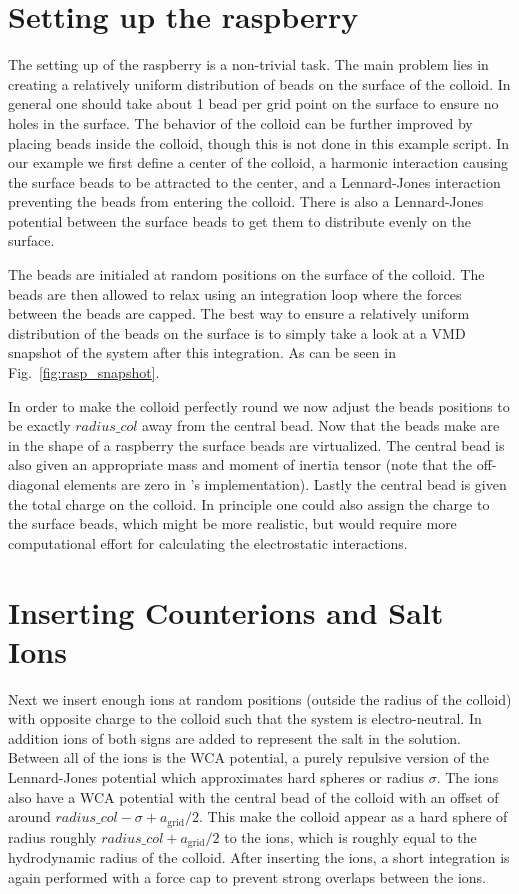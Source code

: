 \documentclass[
paper=a4,                       %
fontsize=11pt,                  %
twoside,                        %
footsepline,                    %
headsepline,                    %
headinclude=false,              %
footinclude=false,              %
pagesize,                       %
]{scrartcl}
\begin{document}
\section{Setting up the raspberry}

The setting up of the raspberry is a non-trivial task. The main problem lies in creating a relatively
uniform distribution of beads on the surface of the colloid. In general one should take about 1 bead per grid
point on the surface to ensure no holes in the surface. The behavior of the colloid can be further improved by placing
beads inside the colloid, though this is not done in this example script. In our example
we first define a center of the colloid, a harmonic interaction causing the surface beads to be attracted
to the center, and a Lennard-Jones interaction preventing the beads from entering the colloid. There is also a Lennard-Jones
potential between the surface beads to get them to distribute evenly on the surface. 

The beads are initialed at random positions on the surface of the colloid. The beads are then allowed to relax using
an integration loop where the forces between the beads are capped. The best way to ensure a relatively uniform distribution
of the beads on the surface is to simply take a look at a VMD snapshot of the system after this integration. As can
be seen in Fig.~\ref{fig:rasp_snapshot}.

In order to make the colloid perfectly round we now adjust the beads positions to be exactly $radius\_col$ away
from the central bead.
Now that the beads make are in the shape of a raspberry the surface beads are virtualized. The central
bead is also given an appropriate mass and moment of inertia tensor (note that the off-diagonal elements
are zero in \es{}'s implementation). Lastly the central bead is given the total charge on the colloid. In principle
one could also assign the charge to the surface beads, which might be more realistic, but would require more computational
effort for calculating the electrostatic interactions.

\section{Inserting Counterions and Salt Ions}

Next we insert enough ions at random positions (outside the radius of the colloid) with opposite charge to the colloid such that the system is electro-neutral. In addition ions
of both signs are added to represent the salt in the solution. Between all of the ions is the WCA potential, a purely repulsive
version of the Lennard-Jones potential which approximates hard spheres or radius $\sigma$. The ions also have a WCA potential
with the central bead of the colloid with an offset of around $radius\_col-\sigma +a_\mathrm{grid}/2$. This make
the colloid appear as a hard sphere of radius roughly $radius\_col+a_\mathrm{grid}/2$ to the ions, which is roughly equal to the
hydrodynamic radius of the colloid. After inserting the ions, a short integration is again performed with a force cap to
prevent strong overlaps between the ions.
\end{document}
